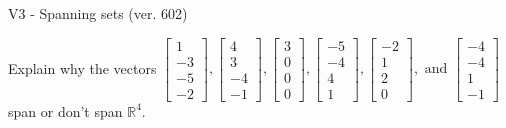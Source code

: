 \begin{exercise}
  \begin{exerciseTitle}V3 - Spanning sets (ver. 602)\end{exerciseTitle}
  \begin{exerciseStatement}
    Explain why the vectors \(\left[\begin{array}{r}
1 \\
-3 \\
-5 \\
-2
\end{array}\right] , \left[\begin{array}{r}
4 \\
3 \\
-4 \\
-1
\end{array}\right] , \left[\begin{array}{r}
3 \\
0 \\
0 \\
0
\end{array}\right] , \left[\begin{array}{r}
-5 \\
-4 \\
4 \\
1
\end{array}\right] , \left[\begin{array}{r}
-2 \\
1 \\
2 \\
0
\end{array}\right] , \text{ and } \left[\begin{array}{r}
-4 \\
-4 \\
1 \\
-1
\end{array}\right]\) span or don't span \(\mathbb{R}^4\). 
	



\end{exerciseStatement}
\end{exercise}

